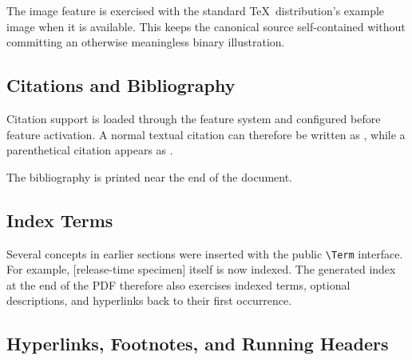 The image feature is exercised with the standard \TeX~distribution's example
image when it is available. This keeps the canonical source self-contained
without committing an otherwise meaningless binary illustration.


\subsection{Citations and Bibliography}

Citation support is loaded through the feature system and configured before
feature activation. A normal textual citation can therefore be written as
\textcite{knuth1984texbook}, while a parenthetical citation appears as
\parencite{knuth1984texbook}.

The bibliography is printed near the end of the document.

\subsection{Index Terms}

Several concepts in earlier sections were inserted with the public
\texttt{\textbackslash Term} interface. For example,
[release-time specimen] itself is now indexed. The generated index at the end
of the PDF therefore also exercises indexed terms, optional descriptions, and
hyperlinks back to their first occurrence.

\subsection{Hyperlinks, Footnotes, and Running Headers}

